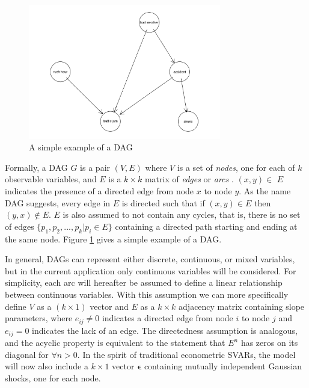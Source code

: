 \documentclass{article}
\begin{document}
\begin{figure}
  \centering
  \includegraphics[width=0.75\textwidth]{images/trafficjam.png}
  \caption{A simple example of a DAG \parencite{traffic_jam}}
  \label{dag1}
\end{figure}

Formally, a DAG $G$ is a pair $(V,E)$ where $V$ is a set of \textit{nodes}, one for each of $k$ observable variables, and $E$ is a $k \times k$ matrix of \textit{edges} or \textit{arcs} \parencite{kalisch2007estimating}. $(x,y) \in$ $E$ indicates the presence of a directed edge from node $x$ to node $y$. As the name DAG suggests, every edge in $E$ is directed such that if $(x,y) \in E$ then $(y,x) \not \in E$. $E$ is also assumed to not contain any cycles, that is, there is no set of edges $\{p_1, p_2, ..., p_k | p_i \in E\}$ containing a directed path starting and ending at the same node. Figure \ref{dag1} gives a simple example of a DAG.

In general, DAGs can represent either discrete, continuous, or mixed variables, but in the current application only continuous variables will be considered. For simplicity, each arc will hereafter be assumed to define a linear relationship between continuous variables. With this assumption we can more specifically define $V$ as a $(k \times 1)$ vector and $E$ as a $k \times k$ adjacency matrix containing slope parameters, where $e_{ij} \not = 0$ indicates a directed edge from node $i$ to node $j$ and $e_{ij} = 0$ indicates the lack of an edge. The directedness assumption is analogous, and the acyclic property is equivalent to the statement that $E^n$ has zeros on its diagonal for $\forall n > 0$. In the spirit of traditional econometric SVARs, the model will now also include a $k \times 1$ vector $\mathbf{\epsilon}$ containing mutually independent Gaussian shocks, one for each node.
\end{document}
